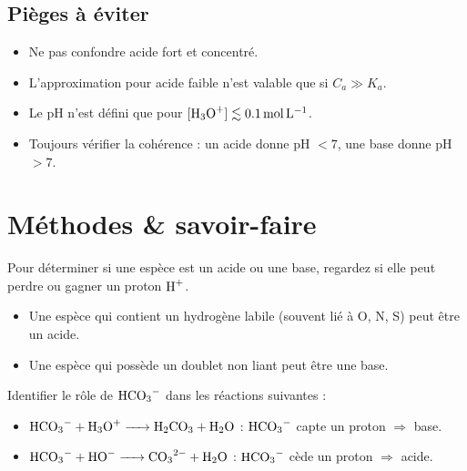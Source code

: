 \begin{synthese}
\subsection*{Pièges à éviter}
\begin{itemize}
    \item Ne pas confondre acide fort et concentré.
    \item L'approximation pour acide faible n'est valable que si $C_a \gg K_a$.
    \item Le pH n'est défini que pour $[\ce{H3O+}] \lesssim \SI{0.1}{\mol\per\litre}$.
    \item Toujours vérifier la cohérence : un acide donne pH $< 7$, une base donne pH $> 7$.
\end{itemize}
\end{synthese}

\section{Méthodes \& savoir-faire}

Pour déterminer si une espèce est un acide ou une base, regardez si elle peut perdre ou gagner un proton $\ce{H+}$.
\begin{itemize}
    \item Une espèce qui contient un hydrogène labile (souvent lié à O, N, S) peut être un acide.
    \item Une espèce qui possède un doublet non liant peut être une base.
\end{itemize}
\begin{exemple}
Identifier le rôle de $\ce{HCO3-}$ dans les réactions suivantes :
\begin{itemize}
    \item $\ce{HCO3- + H3O+ -> H2CO3 + H2O}$ : $\ce{HCO3-}$ capte un proton $\Rightarrow$ base.
    \item $\ce{HCO3- + HO- -> CO3^2- + H2O}$ : $\ce{HCO3-}$ cède un proton $\Rightarrow$ acide.
\end{itemize}
\end{exemple}

